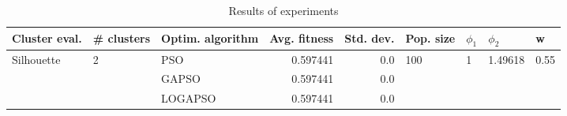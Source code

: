 \begin{table}
\centering
\caption{Results of experiments}
\begin{tabular}{lllrrllll}
\toprule
              Cluster eval. &        \# clusters & Optim. algorithm &  Avg. fitness &  Std. dev. &            Pop. size &         $\phi_{1}$ &               $\phi_{2}$ &                     w \\
\midrule
\multirow{3}{*}{Silhouette} & \multirow{3}{*}{2} &              PSO &      0.597441 &        0.0 & \multirow{3}{*}{100} & \multirow{3}{*}{1} & \multirow{3}{*}{1.49618} & \multirow{3}{*}{0.55} \\
                            &                    &            GAPSO &      0.597441 &        0.0 &                      &                    &                          &                       \\
                            &                    &          LOGAPSO &      0.597441 &        0.0 &                      &                    &                          &                       \\
\bottomrule
\end{tabular}
\end{table}
